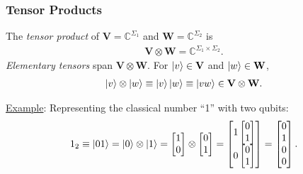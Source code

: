 \documentclass{beamer}
\theoremstyle{definition}
\newcommand{\V}{\mathbf{V}}
\newcommand{\W}{\mathbf{W}}
\begin{document}
\begin{frame}
\frametitle{Tensor Products}
The \textit{tensor product} of $\V = \mathbb{C}^{\Sigma_1}$ and $\W = \mathbb{C}^{\Sigma_2}$ is
\begin{align*}
\V \otimes \W = \mathbb{C}^{\Sigma_1 \times \Sigma_2}.
\end{align*}
\textit{Elementary tensors} span $\V\otimes \W$. For $\ket{v} \in \V$ and $\ket{w} \in \W$, 
\begin{align*}
\ket{v}\otimes \ket{w}\equiv \ket{v}\ket{w} \equiv \ket{vw}  \in \V \otimes \W.
\end{align*} 

\underline{Example}: Representing the classical number ``1'' with two qubits:
\begin{align*}
1_2 \equiv \left\vert{01}\right\rangle = \left\vert{0}\right\rangle \otimes \left\vert{1}\right\rangle = \begin{bmatrix}
1\\0
\end{bmatrix}\otimes 
\begin{bmatrix}
0\\1
\end{bmatrix}
=
\begin{bmatrix}
1\begin{bmatrix}
0\\1
\end{bmatrix}\\
0\begin{bmatrix}
0\\1
\end{bmatrix}
\end{bmatrix} = \begin{bmatrix}
0\\1\\0\\0
\end{bmatrix}.
\end{align*}


\end{frame}
\end{document}
